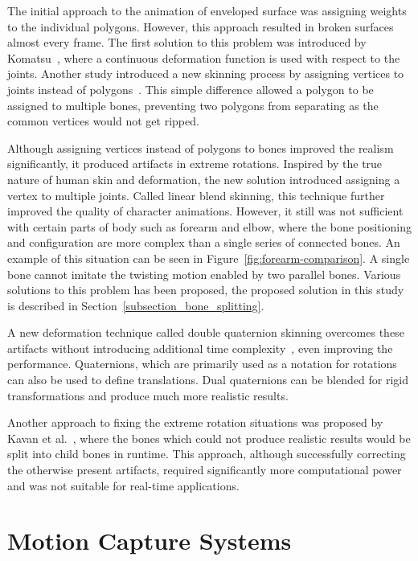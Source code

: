 The initial approach to the animation of enveloped surface was assigning weights to the individual polygons. However, this approach resulted in broken surfaces almost every frame. The first solution to this problem was introduced by Komatsu~\cite{Komatsu1988}, where a continuous deformation function is used with respect to the joints. Another study introduced a new skinning process by assigning vertices to joints instead of polygons~\cite{Lander1988}. This simple difference allowed a polygon to be assigned to multiple bones, preventing two polygons from separating as the common vertices would not get ripped.

Although assigning vertices instead of polygons to bones improved the realism significantly, it produced artifacts in extreme rotations. Inspired by the true nature of human skin and deformation, the new solution introduced assigning a vertex to multiple joints. Called linear blend skinning, this technique further improved the quality of character animations. However, it still was not sufficient with certain parts of body such as forearm and elbow, where the bone positioning and configuration are more complex than a single series of connected bones. An example of this situation can be seen in Figure~\ref{fig:forearm-comparison}.
A single bone cannot imitate the twisting motion enabled by two parallel bones. Various solutions to this problem has been proposed, the proposed solution in this study is described in Section~\ref{subsection_bone_splitting}. 

A new deformation technique called double quaternion skinning overcomes these artifacts without introducing additional time complexity~\cite{Kavan2007}, even improving the performance. Quaternions, which are primarily used as a notation for rotations can also be used to define translations. Dual quaternions can be blended for rigid transformations and produce much more realistic results.

Another approach to fixing the extreme rotation situations was proposed by Kavan et al.~\cite{Kavan2009}, where the bones which could not produce realistic results would be split into child bones in runtime. This approach, although successfully correcting the otherwise present artifacts, required significantly more computational power and was not suitable for real-time applications. 


\section{Motion Capture Systems}
\label{section_related_mocap}
 
